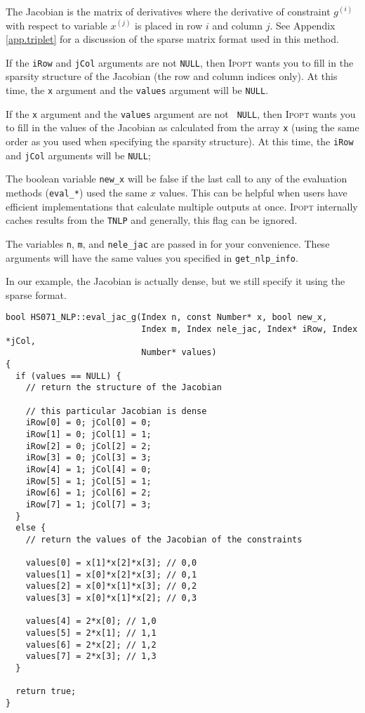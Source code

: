 \documentclass[10pt]{article}
\newcommand{\Ipopt}{\textsc{Ipopt}\xspace}
\begin{document}
The Jacobian is the matrix of derivatives where the derivative of
constraint $g^{(i)}$ with respect to variable $x^{(j)}$ is placed in
row $i$ and column $j$. See Appendix \ref{app.triplet} for a
discussion of the sparse matrix format used in this method.

If the {\tt iRow} and {\tt jCol} arguments are not {\tt NULL}, then
\Ipopt wants you to fill in the sparsity structure of the Jacobian
(the row and column indices only). At this time, the {\tt x} argument
and the {\tt values} argument will be {\tt NULL}.

If the {\tt x} argument and the {\tt values} argument are not {\tt
  NULL}, then \Ipopt wants you to fill in the values of the Jacobian
as calculated from the array {\tt x} (using the same order as you used
when specifying the sparsity structure). At this time, the {\tt iRow}
and {\tt jCol} arguments will be {\tt NULL};

The boolean variable {\tt new\_x} will be false if the last call to
any of the evaluation methods ({\tt eval\_*}) used the same $x$
values. This can be helpful when users have efficient implementations
that calculate multiple outputs at once. \Ipopt internally caches
results from the {\tt TNLP} and generally, this flag can be ignored.

The variables {\tt n}, {\tt m}, and {\tt nele\_jac} are passed in for
your convenience. These arguments will have the same values you
specified in {\tt get\_nlp\_info}.

In our example, the Jacobian is actually dense, but we still
specify it using the sparse format.

\begin{footnotesize}
\begin{verbatim}
bool HS071_NLP::eval_jac_g(Index n, const Number* x, bool new_x,
                           Index m, Index nele_jac, Index* iRow, Index *jCol,
                           Number* values)
{
  if (values == NULL) {
    // return the structure of the Jacobian

    // this particular Jacobian is dense
    iRow[0] = 0; jCol[0] = 0;
    iRow[1] = 0; jCol[1] = 1;
    iRow[2] = 0; jCol[2] = 2;
    iRow[3] = 0; jCol[3] = 3;
    iRow[4] = 1; jCol[4] = 0;
    iRow[5] = 1; jCol[5] = 1;
    iRow[6] = 1; jCol[6] = 2;
    iRow[7] = 1; jCol[7] = 3;
  }
  else {
    // return the values of the Jacobian of the constraints
    
    values[0] = x[1]*x[2]*x[3]; // 0,0
    values[1] = x[0]*x[2]*x[3]; // 0,1
    values[2] = x[0]*x[1]*x[3]; // 0,2
    values[3] = x[0]*x[1]*x[2]; // 0,3

    values[4] = 2*x[0]; // 1,0
    values[5] = 2*x[1]; // 1,1
    values[6] = 2*x[2]; // 1,2
    values[7] = 2*x[3]; // 1,3
  }

  return true;
}
\end{verbatim}
\end{footnotesize}
\end{document}
